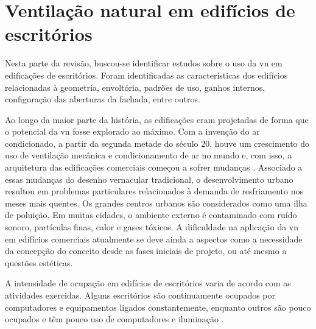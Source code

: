 \section{Ventilação natural em edifícios de escritórios}

Nesta parte da revisão, buscou-se identificar estudos sobre o uso da \acrshort{vn} em edificações de escritórios. Foram identificadas as características dos edifícios relacionadas à geometria, envoltória, padrões de uso, ganhos internos, configuração das aberturas da fachada, entre outros.

Ao longo da maior parte da história, as edificações eram projetadas de forma que o potencial da \acrshort{vn} fosse explorado ao máximo. Com a invenção do ar condicionado, a partir da segunda metade do século 20, houve um crescimento do uso de ventilação mecânica e condicionamento de ar no mundo e, com isso, a arquitetura das edificações comerciais começou a sofrer mudanças \cite{CarrilhodaGraca2016}. Associado a essas mudanças do desenho vernacular tradicional, o desenvolvimento urbano resultou em problemas particulares relacionados à demanda de resfriamento nos meses mais quentes. Os grandes centros urbanos são considerados como uma ilha de poluição. Em muitas cidades, o ambiente externo é contaminado com ruído sonoro, partículas finas, calor e gases tóxicos. A dificuldade na aplicação da \acrshort{vn} em edifícios comerciais atualmente se deve ainda a aspectos como a necessidade da concepção do conceito desde as fases iniciais de projeto, ou até mesmo a questões estéticas.

A intensidade de ocupação em edifícios de escritórios varia de acordo com as atividades exercidas. Alguns escritórios são continuamente ocupados por computadores e equipamentos ligados constantemente, enquanto outros são pouco ocupados e têm pouco uso de computadores e iluminação \cite{Elharidi2018}.

